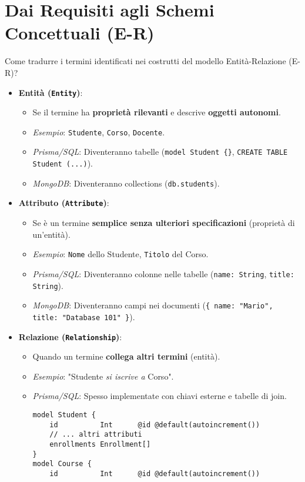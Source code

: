 \documentclass{article}
\begin{document}
	\section{Dai Requisiti agli Schemi Concettuali (E-R)}
	Come tradurre i termini identificati nei costrutti del modello Entità-Relazione (E-R)?
	\begin{itemize}
		\item \textbf{Entità (\texttt{Entity})}:
		\begin{itemize}
			\item Se il termine ha \textbf{proprietà rilevanti} e descrive \textbf{oggetti autonomi}.
			\item \textit{Esempio}: \texttt{Studente}, \texttt{Corso}, \texttt{Docente}.
			\item \textit{Prisma/SQL}: Diventeranno tabelle (\texttt{model Student \{\}}, \texttt{CREATE TABLE Student (...)}).
			\item \textit{MongoDB}: Diventeranno collections (\texttt{db.students}).
		\end{itemize}
		\item \textbf{Attributo (\texttt{Attribute})}:
		\begin{itemize}
			\item Se è un termine \textbf{semplice senza ulteriori specificazioni} (proprietà di un'entità).
			\item \textit{Esempio}: \texttt{Nome} dello Studente, \texttt{Titolo} del Corso.
			\item \textit{Prisma/SQL}: Diventeranno colonne nelle tabelle (\texttt{name: String}, \texttt{title: String}).
			\item \textit{MongoDB}: Diventeranno campi nei documenti (\texttt{\{ name: "Mario", title: "Database 101" \}}).
		\end{itemize}
		\item \textbf{Relazione (\texttt{Relationship})}:
		\begin{itemize}
			\item Quando un termine \textbf{collega altri termini} (entità).
			\item \textit{Esempio}: "Studente \textit{si iscrive a} Corso".
			\item \textit{Prisma/SQL}: Spesso implementate con chiavi esterne e tabelle di join.
			\begin{verbatim}
model Student {
	id          Int      @id @default(autoincrement())
	// ... altri attributi
	enrollments Enrollment[]
}
model Course {
	id          Int      @id @default(autoincrement())

\end{verbatim}
\end{itemize}
\end{itemize}
\end{document}
